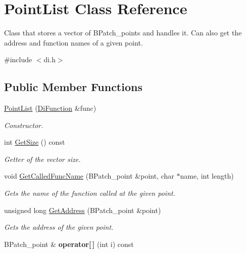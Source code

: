 \hypertarget{class_point_list}{\section{Point\-List Class Reference}
\label{class_point_list}
}


Class that stores a vector of B\-Patch\-\_\-points and handles it. Can also get the address and function names of a given point.  




{\ttfamily \#include $<$di.\-h$>$}

\subsection*{Public Member Functions}
\begin{DoxyCompactItemize}
\item 
\hyperlink{class_point_list_a120d3da68f779570c3470594824aecb5}{Point\-List} (\hyperlink{class_di_function}{Di\-Function} \&func)
\begin{DoxyCompactList}\small\item\em Constructor. \end{DoxyCompactList}\item 
int \hyperlink{class_point_list_a2aeb6e16818aca9c31c8eb876d755168}{Get\-Size} () const 
\begin{DoxyCompactList}\small\item\em Getter of the vector size. \end{DoxyCompactList}\item 
void \hyperlink{class_point_list_aee028324ff3fae28e4a36856acf7f598}{Get\-Called\-Func\-Name} (B\-Patch\-\_\-point \&point, char $\ast$name, int length)
\begin{DoxyCompactList}\small\item\em Gets the name of the function called at the given point. \end{DoxyCompactList}\item 
unsigned long \hyperlink{class_point_list_a7c950aded53ab52480b235889ea5e2ba}{Get\-Address} (B\-Patch\-\_\-point \&point)
\begin{DoxyCompactList}\small\item\em Gets the address of the given point. \end{DoxyCompactList}\item 
\hypertarget{class_point_list_acf7afef0c6265b89ab42e1a12e042313}{B\-Patch\-\_\-point \& {\bfseries operator\mbox{[}$\,$\mbox{]}} (int i) const }\label{class_point_list_acf7afef0c6265b89ab42e1a12e042313}

\end{DoxyCompactItemize}


